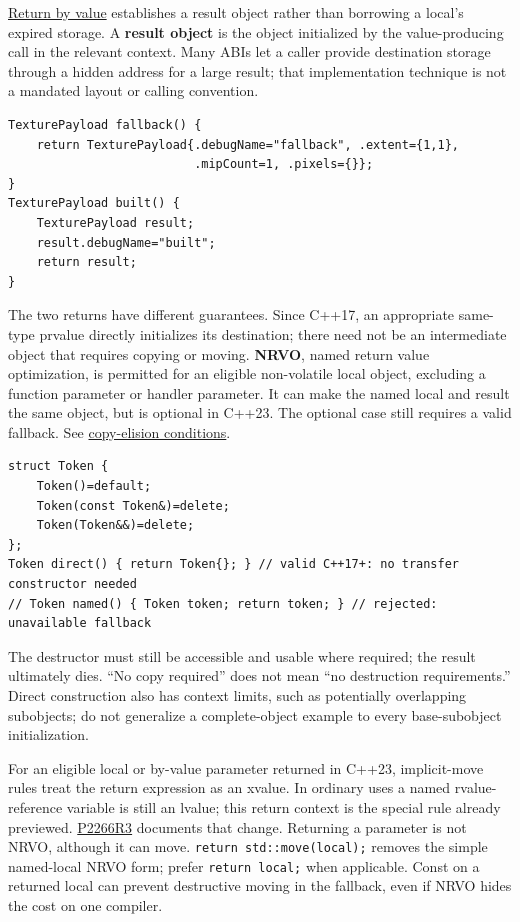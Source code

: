 \hyperref[appendix-b08d3788c5c6]{Return by value} establishes a result object rather than borrowing a local's expired storage. A \textbf{result object} is the object initialized by the value-producing call in the relevant context. Many ABIs let a caller provide destination storage through a hidden address for a large result; that implementation technique is not a mandated layout or calling convention.

\begin{verbatim}
TexturePayload fallback() {
    return TexturePayload{.debugName="fallback", .extent={1,1},
                          .mipCount=1, .pixels={}};
}
TexturePayload built() {
    TexturePayload result;
    result.debugName="built";
    return result;
}
\end{verbatim}

The two returns have different guarantees. Since C++17, an appropriate same-type prvalue directly initializes its destination; there need not be an intermediate object that requires copying or moving. \textbf{NRVO}, named return value optimization, is permitted for an eligible non-volatile local object, excluding a function parameter or handler parameter. It can make the named local and result the same object, but is optional in C++23. The optional case still requires a valid fallback. See \href{https://eel.is/c++draft/class.copy.elision}{copy-elision conditions}.

\begin{verbatim}
struct Token {
    Token()=default;
    Token(const Token&)=delete;
    Token(Token&&)=delete;
};
Token direct() { return Token{}; } // valid C++17+: no transfer constructor needed
// Token named() { Token token; return token; } // rejected: unavailable fallback
\end{verbatim}

The destructor must still be accessible and usable where required; the result ultimately dies. ``No copy required'' does not mean ``no destruction requirements.'' Direct construction also has context limits, such as potentially overlapping subobjects; do not generalize a complete-object example to every base-subobject initialization.

For an eligible local or by-value parameter returned in C++23, implicit-move rules treat the return expression as an xvalue. In ordinary uses a named rvalue-reference variable is still an lvalue; this return context is the special rule already previewed. \href{https://www.open-std.org/jtc1/sc22/wg21/docs/papers/2022/p2266r3.html}{P2266R3} documents that change. Returning a parameter is not NRVO, although it can move. \texttt{return\ std::move(local);} removes the simple named-local NRVO form; prefer \texttt{return\ local;} when applicable. Const on a returned local can prevent destructive moving in the fallback, even if NRVO hides the cost on one compiler.

